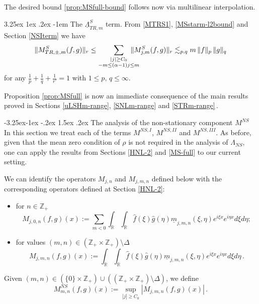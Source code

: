\documentclass[a4paper,reqno]{amsart}
\makeatletter
\def\subsection{\@startsection{subsection}{2}{\z@}%
	{-3.25ex\@plus -1ex \@minus -.2ex}%
	{1.5ex \@plus .2ex}%
	{\normalfont\bfseries\boldmath}}
\renewcommand\paragraph{\@startsection{paragraph}{4}{\z@}%
	{3.25ex \@plus1ex \@minus.2ex}%
	{-1em}%
	{\normalfont\normalsize\bfseries}}
\numberwithin{equation}{section}
\theoremstyle{definition}
\newcommand{\R}{\mathbb{R}}
\newcommand{\Z}{\mathbb{Z}}
\newcommand{\um}{\underline{m}}
\newcommand{\uL}{\underline{\Lambda}}
\def\a{\alpha}
\def\L{\Lambda}
\makeatother
\begin{document}
The desired bound \eqref{prop:MSfull-bound} follows now via multilinear interpolation.

\paragraph{The $\uL^{S}_{TR,m}$ term.}\label{STRm-range} From \eqref{MTRS1}, \eqref{MSstarm-l2bound} and Section \ref{NSIterm} we have
\begin{equation}
	\|M^S_{TR,\pm,m}(f,g)\|_r\le \sum_{\substack{|j|\geq C_0\\-m\leq (\a-1)j\leq m}} \hspace{-.5cm} \|M^S_{j,m}(f,g)\|_r\lesssim_{p,q} m\, \|f\|_p\,\|g\|_q
\end{equation}
for any $\frac{1}{p}+\frac{1}{q}+\frac{1}{r'}=1$ with $1\leq p,\,q\leq \infty$.

Proposition \ref{prop:MSfull} is now an immediate consequence of the main results proved in Sections \ref{uLSHm-range}, \ref{SNLm-range} and \ref{STRm-range}\,.

\subsection{The analysis of the non-stationary component $M^{NS}$}
In this section we treat each of the terms $M^{NS,I}$, $M^{NS,II}$ and $M^{NS,III}$. As before, given that the mean zero condition of $\rho$ is not required in the analysis of $\L_{NS}$, one can apply the results from Sections \ref{HNL-2} and \ref{MS-full} to our current setting.

We can identify the operators $M_{j,n}$ and $M_{j,m,n}$ defined below with the corresponding operators defined at Section \ref{HNL-2}:
\begin{itemize}
	\item for $n\in \Z_+$
	\begin{equation*}
		M_{j,0,n}(f,g)(x):=\sum_{m<0}\int_\R\int_\R\hat{f}(\xi)\hat{g}(\eta)\um_{j,m,n}(\xi,\eta)e^{i\xi x}e^{i\eta x} d\xi d\eta;
	\end{equation*}
	\item for values $(m,n)\in(\Z_+\times \Z_+)\setminus\Delta$
	\begin{equation*}
		M_{j,m,n}(f,g)(x):=\int_\R\int_\R\hat{f}(\xi)\hat{g}(\eta)\um_{j,m,n}(\xi,\eta)e^{i\xi x}e^{i\eta x} d\xi d\eta\,.
	\end{equation*}
\end{itemize}

Given $(m,n)\in (\{0\}\times\Z_+)\cup ((\Z_+\times \Z_+)\setminus\Delta)$, we define
\begin{equation}
	M^{NS}_{m,n}(f,g)(x):= \sup_{|j|\geq C_0} |M_{j,m,n}(f,g)(x)|\,.
\end{equation}
\end{document}
